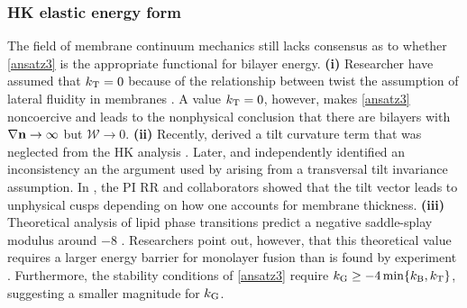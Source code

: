 
\subsubsection{HK elastic energy form}
The field of membrane continuum mechanics still lacks consensus as to whether \eqref{ansatz3} is the appropriate functional for bilayer energy.
\textbf{(i)} Researcher have assumed that $k_{\mathrm{T}} = 0$ because of the relationship between twist the assumption of lateral fluidity in membranes 
\cite{Hamm2000, TerziDeserno17, C9SM02079A, PhysRevE.102.042406}. 
A value $k_{\mathrm{T}} = 0$, however, makes \eqref{ansatz3} noncoercive and leads to the nonphysical conclusion that there are bilayers 
with $\nabla {\bf n} \to \infty$ but $\mathcal{W} \to 0.$ 
  \textbf{(ii)}
Recently, \cite{TerziDeserno17} derived a tilt curvature term that was neglected from the HK analysis \cite{Hamm2000}.
Later, \cite{C9SM02079A} 
and \cite{PhysRevE.102.042406} independently identified an inconsistency an the argument used by \cite{TerziDeserno17} arising
from a transversal tilt invariance assumption.
In \cite{RyKlYaCo16}, the PI RR and collaborators showed that the tilt vector leads to unphysical cusps depending on how one accounts for membrane thickness.  
  \textbf{(iii)}
  Theoretical analysis of lipid phase transitions predict a negative saddle-splay modulus around $-8$ \kBT\;
\cite{SIEGEL2004366,SIEGEL20085200}. Researchers point out, however, that this theoretical value requires a larger energy 
barrier for monolayer fusion than is found by experiment \cite{FrRoPi17,Tran7106,TerziDeserno17}.
Furthermore, the stability conditions of \eqref{ansatz3} require $k_{\mathrm{G}} \geq -4\min\{k_{\mathrm{B}},k_{\mathrm{T}}\}$, suggesting a smaller magnitude for $k_{\mathrm{G}}$.


